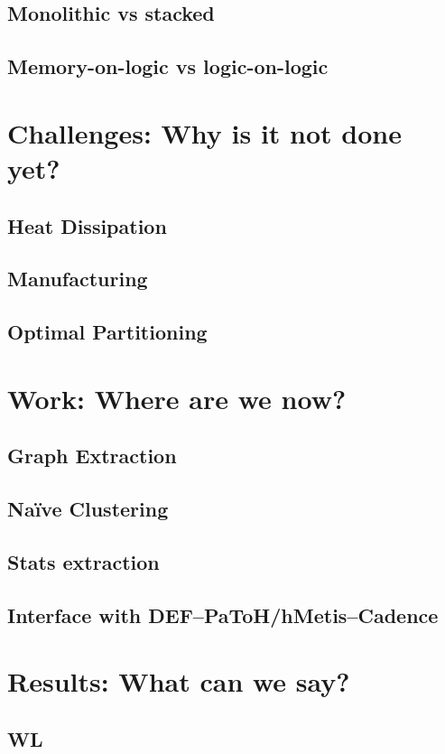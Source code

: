 \documentclass[12pt,a4paper]{article}
\theoremstyle{customdef}
\begin{document}
\subsection{Monolithic vs stacked}
\subsection{Memory-on-logic vs logic-on-logic}


\section{Challenges: Why is it not done yet?}
\subsection{Heat Dissipation}
\subsection{Manufacturing}
\subsection{Optimal Partitioning}


\section{Work: Where are we now?}
\subsection{Graph Extraction}
\subsection{Naïve Clustering}
\subsection{Stats extraction}
\subsection{Interface with DEF--PaToH/hMetis--Cadence}


\section{Results: What can we say?}
\subsection{WL}
\end{document}
